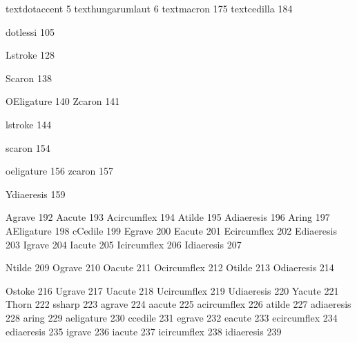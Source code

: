  textdotaccent       5
 texthungarumlaut    6
 textmacron        175 
 textcedilla       184  

 dotlessi          105 

 Lstroke           128

 Scaron            138

 OEligature        140
 Zcaron            141

 lstroke           144

 scaron            154

 oeligature        156
 zcaron            157

 Ydiaeresis        159

 Agrave            192
 Aacute            193
 Acircumflex       194
 Atilde            195
 Adiaeresis        196      
 Aring             197
 AEligature        198
 cCedile           199
 Egrave            200
 Eacute            201
 Ecircumflex       202
 Ediaeresis        203
 Igrave            204
 Iacute            205
 Icircumflex       206
 Idiaeresis        207

 Ntilde            209
 Ograve            210
 Oacute            211
 Ocircumflex       212
 Otilde            213
 Odiaeresis        214

 Ostoke            216
 Ugrave            217
 Uacute            218
 Ucircumflex       219
 Udiaeresis        220
 Yacute            221
 Thorn             222
 ssharp            223
 agrave            224
 aacute            225
 acircumflex       226
 atilde            227
 adiaeresis        228      
 aring             229
 aeligature        230
 ccedile           231
 egrave            232
 eacute            233
 ecircumflex       234
 ediaeresis        235      
 igrave            236
 iacute            237
 icircumflex       238
 idiaeresis        239

